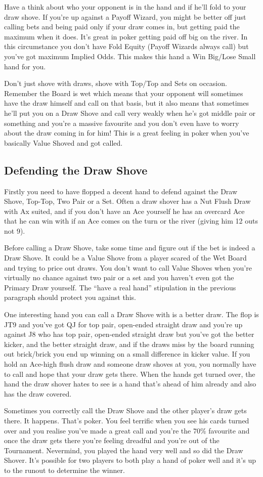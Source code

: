 Have a think about who your opponent is in the hand and if he'll
fold to your draw shove. If you're up against a Payoff Wizard,
you might be better off just calling bets and being paid only if
your draw comes in, but getting paid the maximum when it does. It's
great in poker getting paid off big on the river. In this circumstance
you don't have Fold Equity (Payoff Wizards always call) but you've got
maximum Implied Odds. This makes this hand a Win Big/Lose Small hand
for you.

Don't just shove with draws, shove with Top/Top and Sets on occasion.
Remember the Board is wet which means that your opponent will sometimes
have the draw himself and call on that basis, but it also means that
sometimes he'll put you on a Draw Shove and call very weakly when
he's got middle pair or something and you're a massive favourite and
you don't even have to worry about the draw coming in for him! This
is a great feeling in poker when you've basically Value Shoved and
got called.

\subsection{Defending the Draw Shove}

Firstly you need to have flopped a decent hand to defend against
the Draw Shove, Top-Top, Two Pair or a Set. Often a draw shover
has a Nut Flush Draw with Ax suited, and if you don't have an Ace
yourself he has an overcard Ace that he can win with if an Ace
comes on the turn or the river (giving him 12 outs not 9).

Before calling a Draw Shove, take some time and figure out if the
bet is indeed a Draw Shove. It could be a Value Shove from a player
scared of the Wet Board and trying to price out draws. You don't
want to call Value Shoves when you're virtually no chance against
two pair or a set and you haven't even got the Primary Draw yourself.
The ``have a real hand'' stipulation in the previous paragraph should
protect you against this.

One interesting hand you can call a Draw Shove with is a better draw.
The flop is JT9 and you've got QJ for top pair, open-ended straight
draw and you're up against J8 who has top pair, open-ended straight
draw but you've got the better kicker, and the better straight draw,
and if the draws miss by the board running out brick/brick you end up
winning on a small difference in kicker value. If you hold an Ace-high
flush draw and someone draw shoves at you, you normally have to call
and hope that your draw gets there. When the hands get turned over,
the hand the draw shover hates to see is a hand that's ahead of him
already and also has the draw covered.

Sometimes you correctly call the Draw Shove and the other player's
draw gets there. It happens. That's poker. You feel terrific when
you see his cards turned over and you realise you've made a great
call and you're the 70\% favourite and once the draw gets there
you're feeling dreadful and you're out of the Tournament. Nevermind,
you played the hand very well and so did the Draw Shover.
It's possible for two players to both play a hand of poker well
and it's up to the runout to determine the winner.


